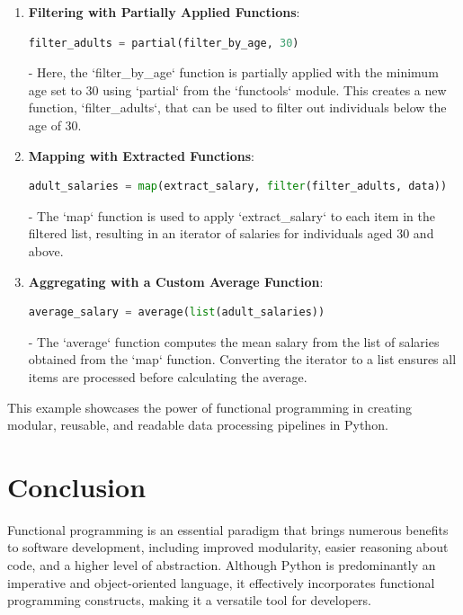 \documentclass[a4paper]{article}
\begin{document}
\begin{enumerate}
    \item \textbf{Filtering with Partially Applied Functions}:
    \begin{lstlisting}[language=Python]
filter_adults = partial(filter_by_age, 30)
\end{lstlisting}
    - Here, the `filter\_by\_age` function is partially applied with the minimum age set to 30 using `partial` from the `functools` module. This creates a new function, `filter\_adults`, that can be used to filter out individuals below the age of 30.

    \item \textbf{Mapping with Extracted Functions}:
    \begin{lstlisting}[language=Python]
adult_salaries = map(extract_salary, filter(filter_adults, data))
\end{lstlisting}
    - The `map` function is used to apply `extract\_salary` to each item in the filtered list, resulting in an iterator of salaries for individuals aged 30 and above.

    \item \textbf{Aggregating with a Custom Average Function}:
    \begin{lstlisting}[language=Python]
average_salary = average(list(adult_salaries))
\end{lstlisting}
    - The `average` function computes the mean salary from the list of salaries obtained from the `map` function. Converting the iterator to a list ensures all items are processed before calculating the average.

\end{enumerate}

This example showcases the power of functional programming in creating modular, reusable, and readable data processing pipelines in Python.

\newpage
\section{Conclusion}
Functional programming is an essential paradigm that brings numerous benefits to software development, including improved modularity, easier reasoning about code, and a higher level of abstraction. Although Python is predominantly an imperative and object-oriented language, it effectively incorporates functional programming constructs, making it a versatile tool for developers.\\
\end{document}

